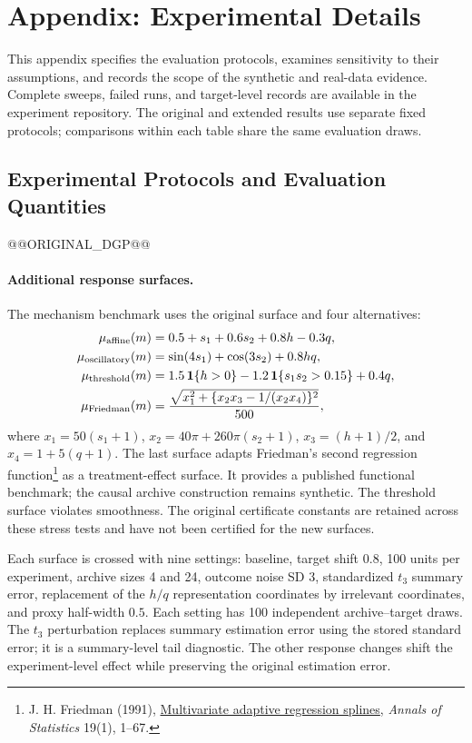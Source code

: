 \section{Appendix: Experimental Details}
\label{app:experiments}

This appendix specifies the evaluation protocols, examines sensitivity to their assumptions, and records the scope of the synthetic and real-data evidence. Complete sweeps, failed runs, and target-level records are available in the experiment repository. The original and extended results use separate fixed protocols; comparisons within each table share the same evaluation draws.

\subsection{Experimental Protocols and Evaluation Quantities}
\label{app:synthetic-dgp}

@@ORIGINAL_DGP@@

\paragraph{Additional response surfaces.}
The mechanism benchmark uses the original surface and four alternatives:
\begin{align*}
\mu_{\rm affine}(m)&=0.5+s_1+0.6s_2+0.8h-0.3q,\\
\mu_{\rm oscillatory}(m)&=\sin(4s_1)+\cos(3s_2)+0.8hq,\\
\mu_{\rm threshold}(m)&=1.5\,\mathbf{1}\{h>0\}-1.2\,\mathbf{1}\{s_1s_2>0.15\}+0.4q,\\
\mu_{\rm Friedman}(m)&=\frac{\sqrt{x_1^2+\{x_2x_3-1/(x_2x_4)\}^2}}{500},
\end{align*}
where $x_1=50(s_1+1)$, $x_2=40\pi+260\pi(s_2+1)$, $x_3=(h+1)/2$, and $x_4=1+5(q+1)$. The last surface adapts Friedman's second regression function\footnote{J. H. Friedman (1991), \href{https://doi.org/10.1214/aos/1176347963}{Multivariate adaptive regression splines}, \emph{Annals of Statistics} 19(1), 1--67.} as a treatment-effect surface. It provides a published functional benchmark; the causal archive construction remains synthetic. The threshold surface violates smoothness. The original certificate constants are retained across these stress tests and have not been certified for the new surfaces.

Each surface is crossed with nine settings: baseline, target shift $0.8$, 100 units per experiment, archive sizes 4 and 24, outcome noise SD 3, standardized $t_3$ summary error, replacement of the $h/q$ representation coordinates by irrelevant coordinates, and proxy half-width $0.5$. Each setting has 100 independent archive--target draws. The $t_3$ perturbation replaces summary estimation error using the stored standard error; it is a summary-level tail diagnostic. The other response changes shift the experiment-level effect while preserving the original estimation error.

